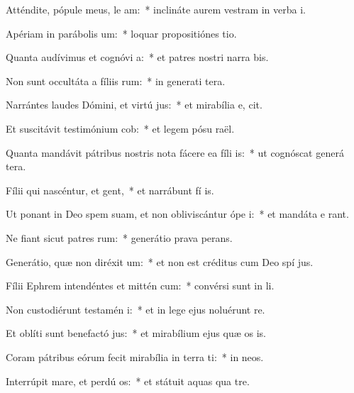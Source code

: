 \item Atténdite, pópule meus, le am:~* inclináte aurem vestram in verba  i.
\item Apériam in parábolis  um:~* loquar propositiónes  tio.
\item Quanta audívimus et cognóvi a:~* et patres nostri narra bis.
\item Non sunt occultáta a fíliis rum:~* in generati tera.
\item Narrántes laudes Dómini, et virtú jus:~* et mirabília e,  cit.
\item Et suscitávit testimónium  cob:~* et legem pósu  raël.
\item Quanta mandávit pátribus nostris nota fácere ea fíli is:~* ut cognóscat generá tera.
\item Fílii qui nascéntur, et gent,~* et narrábunt fí is.
\item Ut ponant in Deo spem suam, et non obliviscántur ópe i:~* et mandáta e rant.
\item Ne fiant sicut patres rum:~* generátio prava  perans.
\item Generátio, quæ non diréxit  um:~* et non est créditus cum Deo spí jus.
\item Fílii Ephrem intendéntes et mittén cum:~* convérsi sunt in  li.
\item Non custodiérunt testamén i:~* et in lege ejus noluérunt re.
\item Et oblíti sunt benefactó jus:~* et mirabílium ejus quæ os is.
\item Coram pátribus eórum fecit mirabília in terra ti:~* in  neos.
\item Interrúpit mare, et perdú os:~* et státuit aquas qua  tre.
